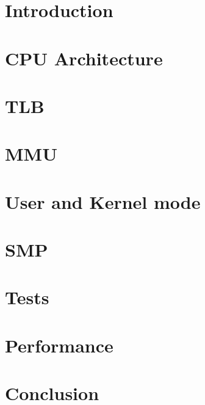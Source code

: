 \documentclass[11pt, twocolumn]{article}
\begin{document}
\clearpage
{}
\setcounter{page}{1}

\noindent


\section{Introduction}




\section{CPU Architecture}


\section{TLB}

\section{MMU}

\section{User and Kernel mode}

\section{SMP}

\section{Tests}

\section{Performance}

\section{Conclusion}


\newpage

{}


\newpage

\appendix
\begin{appendices}
\end{appendices}
\end{document}
